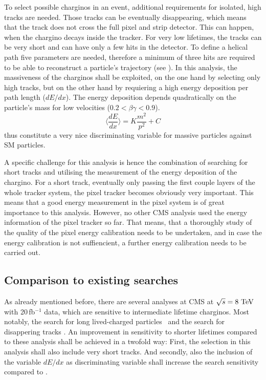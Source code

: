 To select possible charginos in an event, additional requirements for isolated, high \pt tracks are needed.
Those tracks can be eventually disappearing, which means that the track does not cross the full pixel and strip detector.
This can happen, when the chargino decays inside the tracker.
For very low lifetimes, the tracks can be very short and can have only a few hits in the detector. 
To define a helical path five parameters are needed, therefore a minimum of three hits are required to be able to reconstruct a particle's trajectory (see \cite{bib:CMS:tracking_8TeV}).
In this analysis, the massiveness of the charginos shall be exploited, on the one hand by selecting only high \pt tracks, but on the other hand by requiering a high energy deposition per path length ($dE/dx$).
The energy deposition depends quadratically on the particle's mass for low velocities ($0.2<\beta\gamma<0.9$).
\begin{equation*}
\langle\frac{dE}{dx}\rangle = K \frac{m^2}{p^2} +C
\end{equation*}
thus constitute a very nice discriminating variable for massive particles against SM particles.
 
A specific challenge for this analysis is hence the combination of searching for short tracks and utilising the measurement of the energy deposition of the chargino.
For a short track, eventually only passing the first couple layers of the whole tracker system, the pixel tracker becomes obviously very important.
This means that a good energy measurement in the pixel system is of great importance to this analysis.
However, no other CMS analysis used the energy information of the pixel tracker so far.
That means, that a thoroughly study of the quality of the pixel energy calibration needs to be undertaken, and in case the energy calibration is not suffiencient, a further energy calibration needs to be carried out.


\subsection{Comparison to existing searches}
As already mentioned before, there are several analyses at CMS at $\sqrt{s}=8\,\,\text{Te}\kern-0.06667em\text{V}$ with 20\,fb$^{-1}$ data, which are sensitive to intermediate lifetime charginos. 
Most notably, the search for long lived-charged \mbox{particles \cite{bib:CMS:HSCP_8TeV}} and the search for disappering tracks \cite{bib:CMS:DT_8TeV}.
An improvement in sensitivity to shorter lifetimes compared to these analysis shall be achieved in a twofold way:
First, the selection in this analysis shall also include very short tracks.
And secondly, also the inclusion of the variable $dE/dx$ as discriminating variable shall increase the search sensitivity compared to \cite{bib:CMS:DT_8TeV}.

